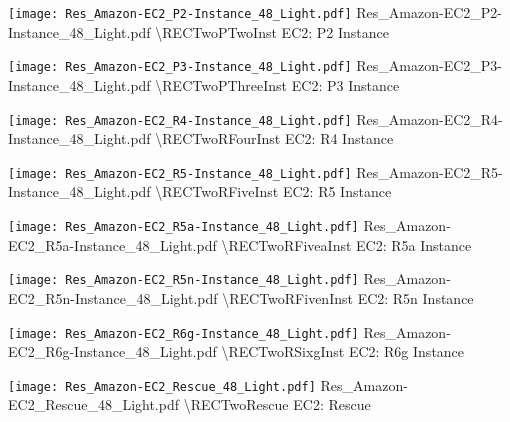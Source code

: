  {\texttt{[image: Res\_Amazon-EC2\_P2-Instance\_48\_Light.pdf]}} {Res\_Amazon-EC2\_P2-Instance\_48\_Light.pdf} {{\textbackslash}RECTwoPTwoInst} {EC2: P2 Instance}

 {\texttt{[image: Res\_Amazon-EC2\_P3-Instance\_48\_Light.pdf]}} {Res\_Amazon-EC2\_P3-Instance\_48\_Light.pdf} {{\textbackslash}RECTwoPThreeInst} {EC2: P3 Instance}

 {\texttt{[image: Res\_Amazon-EC2\_R4-Instance\_48\_Light.pdf]}} {Res\_Amazon-EC2\_R4-Instance\_48\_Light.pdf} {{\textbackslash}RECTwoRFourInst} {EC2: R4 Instance}

 {\texttt{[image: Res\_Amazon-EC2\_R5-Instance\_48\_Light.pdf]}} {Res\_Amazon-EC2\_R5-Instance\_48\_Light.pdf} {{\textbackslash}RECTwoRFiveInst} {EC2: R5 Instance}

 {\texttt{[image: Res\_Amazon-EC2\_R5a-Instance\_48\_Light.pdf]}} {Res\_Amazon-EC2\_R5a-Instance\_48\_Light.pdf} {{\textbackslash}RECTwoRFiveaInst} {EC2: R5a Instance}

 {\texttt{[image: Res\_Amazon-EC2\_R5n-Instance\_48\_Light.pdf]}} {Res\_Amazon-EC2\_R5n-Instance\_48\_Light.pdf} {{\textbackslash}RECTwoRFivenInst} {EC2: R5n Instance}

 {\texttt{[image: Res\_Amazon-EC2\_R6g-Instance\_48\_Light.pdf]}} {Res\_Amazon-EC2\_R6g-Instance\_48\_Light.pdf} {{\textbackslash}RECTwoRSixgInst} {EC2: R6g Instance}

 {\texttt{[image: Res\_Amazon-EC2\_Rescue\_48\_Light.pdf]}} {Res\_Amazon-EC2\_Rescue\_48\_Light.pdf} {{\textbackslash}RECTwoRescue} {EC2: Rescue}

